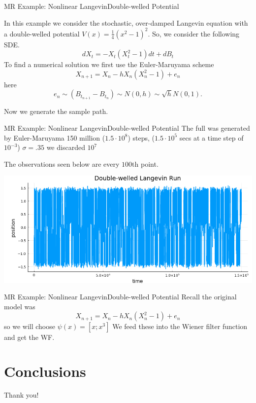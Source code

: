 \documentclass{beamer}  %
\begin{document}

\begin{frame}{MR Example: Nonlinear Langevin}{Double-welled Potential}
	
		In this example we consider the stochastic, over-damped Langevin equation with a double-welled potential $V(x) = \frac{1}{4}(x^2 - 1)^2$. So, we consider the following SDE. 
		$$dX_t = -X_t(X_t^2 - 1)dt + dB_t$$
		To find a numerical solution we first use the Euler-Maruyama scheme 
		$$X_{n+1} = X_n - h X_n(X_n^2 - 1) + e_n$$
		here $$e_n \sim (B_{t_{n+1}}-B_{t_{n}}) \sim N(0,h) \sim \sqrt{h} N(0,1).$$
		
		Now we generate the sample path.
\end{frame}


\begin{frame}{MR Example: Nonlinear Langevin}{Double-welled Potential}
	The full was generated by Euler-Maruyama 150 million ($1.5\cdot 10^8$) steps, ($1.5\cdot 10^5$ secs at a time step of $10^{-3}$) $\sigma = .35$ we discarded $10^7$
	
	The observations seen below are every $100$th point.
	
	\bigskip
	
	\includegraphics[scale=.6]{fig/RunNLL.png}
\end{frame}


\begin{frame}{MR Example: Nonlinear Langevin}{Double-welled Potential}
		Recall the original model was
		$$X_{n+1} = X_n - h X_n(X_n^2 - 1) + e_n$$
		so we will choose $\psi(x) = [x;x^3]$
		We feed these into the Wiener filter function and get the WF.
		
		
\end{frame}



\section{Conclusions}



\begin{frame}
Thank you!
\end{frame}
\end{document}
